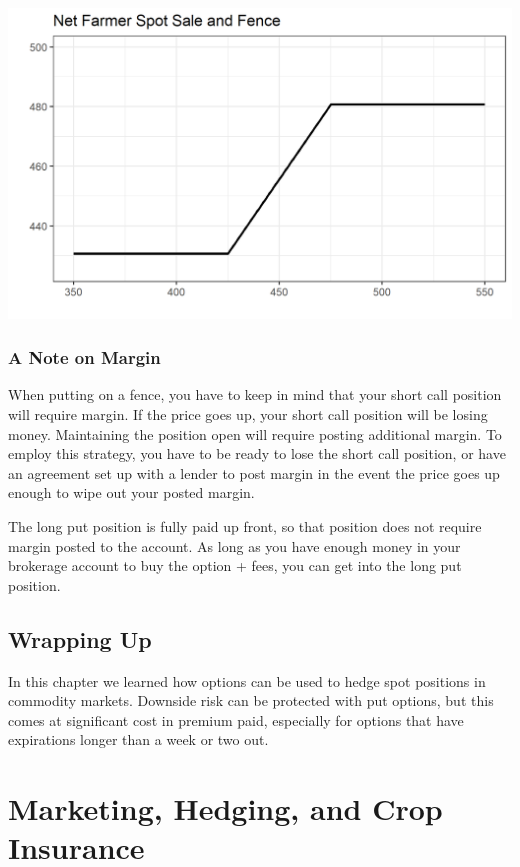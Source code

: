 \documentclass[
]{book}
\begin{document}
\includegraphics{assets/Options4-Netspotfence.png}

\hypertarget{a-note-on-margin}{%
\subsection{A Note on Margin}\label{a-note-on-margin}}

When putting on a fence, you have to keep in mind that your short call position will require margin. If the price goes up, your short call position will be losing money. Maintaining the position open will require posting additional margin. To employ this strategy, you have to be ready to lose the short call position, or have an agreement set up with a lender to post margin in the event the price goes up enough to wipe out your posted margin.

The long put position is fully paid up front, so that position does not require margin posted to the account. As long as you have enough money in your brokerage account to buy the option + fees, you can get into the long put position.

\hypertarget{wrapping-up}{%
\section{Wrapping Up}\label{wrapping-up}}

In this chapter we learned how options can be used to hedge spot positions in commodity markets. Downside risk can be protected with put options, but this comes at significant cost in premium paid, especially for options that have expirations longer than a week or two out.

\hypertarget{marketing-hedging-and-crop-insurance}{%
\chapter{Marketing, Hedging, and Crop Insurance}\label{marketing-hedging-and-crop-insurance}}
\end{document}
